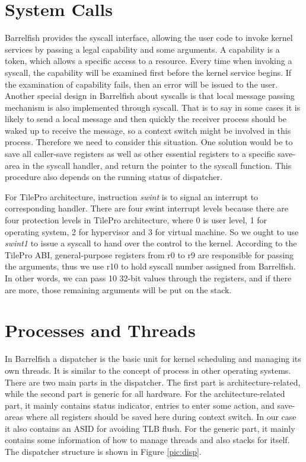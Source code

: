 \documentclass[a4paper,twoside]{report} %
\begin{document}
\section{System Calls}
Barrelfish provides the syscall interface, allowing the user code to invoke kernel services by passing a legal capability and some arguments. A capability is a token, which allows a specific access to a resource. Every time when invoking a syscall, the capability will be examined first before the kernel service begins. If the examination of capability fails, then an error will be issued to the user. Another special design in Barrelfish about syscalls is that local message passing mechanism is also implemented through syscall. That is to say in some cases it is likely to send a local message and then quickly the receiver process should be waked up to receive the message, so a context switch might be involved in this process. Therefore we need to consider this situation. One solution would be to save all caller-save registers as well as other essential registers to a specific save-area in the syscall handler, and return the pointer to the syscall function. This procedure also depends on the running status of dispatcher.

For TilePro architecture, instruction \emph{swint} is to signal an interrupt to corresponding handler. There are four swint interrupt levels because there are four protection levels in TilePro architecture, where 0 is user level, 1 for operating system, 2 for hypervisor and 3 for virtual machine. So we ought to use \emph{swint1} to issue a syscall to hand over the control to the kernel. According to the TilePro ABI, general-purpose registers from r0 to r9 are responsible for passing the arguments, thus we use r10 to hold syscall number assigned from Barrelfish. In other words, we can pass 10 32-bit values through the registers, and if there are more, those remaining arguments will be put on the stack.

\section{Processes and Threads}
In Barrelfish a dispatcher is the basic unit for kernel scheduling and managing its own threads. It is similar to the concept of process in other operating systems. There are two main parts in the dispatcher. The first part is architecture-related, while the second part is generic for all hardware. For the architecture-related part, it mainly contains status indicator, entries to enter some action, and save-areas where all registers should be saved here during context switch. In our case it also contains an ASID for avoiding TLB flush. For the generic part, it mainly contains some information of how to manage threads and also stacks for itself. The dispatcher structure is shown in Figure \ref{pic:disp}.
\end{document}
